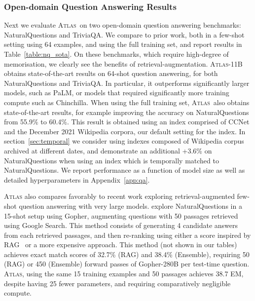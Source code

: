 \documentclass[10pt]{article} \usepackage[preprint]{tmlr}
\newcommand{\Atlas}{\textsc{Atlas}}
\begin{document}
\subsubsection{Open-domain Question Answering Results} 
Next we evaluate \Atlas~on two open-domain question answering benchmarks: NaturalQuestions and TriviaQA.
We compare to prior work, both in a few-shot setting using 64 examples, and using the full training set, and report results in Table~\ref{table:nq_sota}.
On these benchmarks, which require high-degree of memorisation, we clearly see the benefits of retrieval-augmentation.
 \Atlas{}-11B obtains state-of-the-art results on 64-shot question answering, for both NaturalQuestions and TriviaQA.
In particular, it outperforms significantly larger models, such as PaLM, or models that required significantly more training compute such as Chinchilla.
When using the full training set, \Atlas~also obtains state-of-the-art results, for example improving the accuracy on NaturalQuestions from 55.9\% to 60.4\%.
This result is obtained using an index comprised of CCNet and the December 2021 Wikipedia corpora, our default setting for the index.
In section~\ref{sec:temporal} we consider using indexes composed of Wikipedia corpus archived at different dates, and demonstrate an additional +3.6\% on NaturalQuestions when using an index which is temporally matched to NaturalQuestions.
We report performance as a function of model size as well as detailed hyperparameters in Appendix~\ref{app:qa}.

\Atlas{} also compares favorably to recent work exploring retrieval-augmented few-shot question answering with very large models. \citet{Lazaridou2022InternetaugmentedLM} explore NaturalQuestions in a 15-shot setup using Gopher, augmenting questions with 50 passages retrieved using Google Search. 
This method consists of generating 4 candidate answers from each retrieved passages, and then re-ranking using either a score inspired by RAG~\citep{lewis2020retrieval} or a more expensive approach.
This method (not shown in our tables) achieves exact match scores of 32.7\% (RAG) and 38.4\% (Ensemble), requiring 50 (RAG) or 450 (Ensemble) forward passes of Gopher-280B per test-time question.
\Atlas{}, using the same 15 training examples and 50 passages achieves 38.7 EM, despite having 25 fewer parameters, and requiring comparatively negligible  compute.
\end{document}
